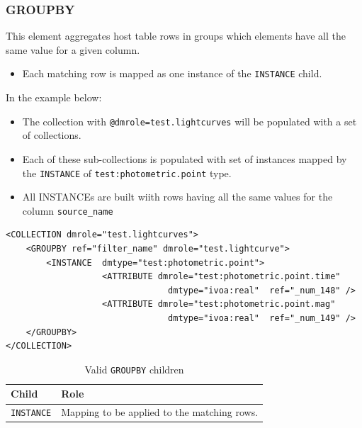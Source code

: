 \documentclass[11pt,a4paper]{ivoa}
\begin{document}
%
%

\subsubsection{GROUPBY}
This element aggregates host table rows  in groups which elements have all the same value for a given column.

\begin{itemize}
    \item Each matching row  is mapped as one instance of the \texttt{INSTANCE} child.
\end{itemize}

In the example below:

\begin{itemize}
    \item The collection with \texttt{@dmrole=test.lightcurves} will be populated with a set of collections.
    \item Each of these sub-collections is populated with set of instances mapped by the \texttt{INSTANCE} of \texttt{test:photometric.point} type.
    \item All INSTANCEs are built wiith rows having all the same values for the column \texttt{source\_name}
\end{itemize}

\begin{lstlisting}[caption={GROUPBY examples},style=XML]
<COLLECTION dmrole="test.lightcurves">
    <GROUPBY ref="filter_name" dmrole="test.lightcurve">
        <INSTANCE  dmtype="test:photometric.point">
                   <ATTRIBUTE dmrole="test:photometric.point.time" 
                                dmtype="ivoa:real"  ref="_num_148" />
                   <ATTRIBUTE dmrole="test:photometric.point.mag" 
                                dmtype="ivoa:real"  ref="_num_149" />
    </GROUPBY>
</COLLECTION>
\end{lstlisting}

\begin{table}[hbtp]
\small
\centering
\begin{tabulary}{\linewidth}{|L|J|}
\hline
    \textbf{Child} &
    \textbf{Role} \\
\hline \hline
     \texttt{INSTANCE}    &
     Mapping to be applied to the matching rows.  \\       
\hline
\end{tabulary}
     \caption{Valid  \texttt{GROUPBY} children} 
     \label{tbl:group-children}
\end{table}
\end{document}

